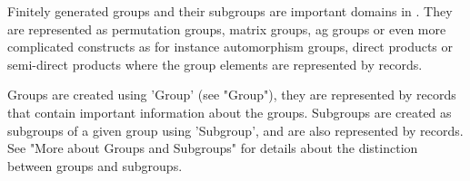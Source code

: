 
Finitely generated groups  and their  subgroups are important  domains in
{\GAP}.  They  are  represented as permutation groups,  matrix groups, ag
groups or even  more complicated constructs  as for instance automorphism
groups, direct products or semi-direct products  where the group elements
are represented by records.

Groups  are created using 'Group' (see "Group"),  they are represented by
records that contain important  information  about the groups.  Subgroups
are created as subgroups of a given group using 'Subgroup', and are  also
represented  by records.   See  "More about  Groups  and  Subgroups"  for
details about the distinction between groups and subgroups.

